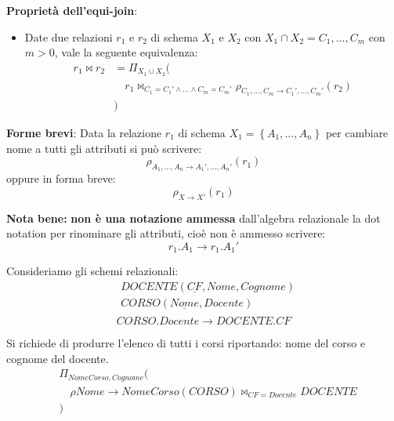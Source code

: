 \documentclass[a4paper,twoside]{article}
\begin{document}
\begin{itemize}
\begin{itemize}
\begin{itemize}
            \vspace{1em}
            \noindent
            \textbf{Proprietà dell'equi-join}:
            \begin{itemize}
              \item Date due relazioni \( r_1 \) e \( r_2 \) di schema \( X_1 \) e \( X_2 \) 
                con \( X_1 \cap X_2 = {C_1, \ldots, C_m} \) con \( m > 0 \), vale la
                seguente equivalenza:
                \[
                  \begin{aligned}
                    r_1 \bowtie r_2 &= \Pi_{X_1 \cup X_2}(\\
                                    & \quad r_1 \bowtie_{C_1 = C_1' \land \ldots \land C_m = C_m'}
                    \rho_{C_1, \ldots, C_m \to C_1', \ldots, C_m'}(r_2)\\
                                    &)
                  \end{aligned}
                \] 
            \end{itemize}

            \vspace{1em}
            \noindent
            \textbf{Forme brevi}: Data la relazione \( r_1 \) di schema \( X_1 = \left\{ A_1, \ldots, A_n \right\} \)
            per cambiare nome a tutti gli attributi si può scrivere:
            \[
               \rho_{A_1, \ldots, A_n \to A_1', \ldots, A_n'}(r_1)
            \] 
            oppure in forma breve:
            \[
              \rho_{X \to X'}(r_1)
            \] 

            \textbf{Nota bene:} \textbf{non è una notazione ammessa} dall'algebra relazionale la dot
            notation per rinominare gli attributi, cioè non è ammesso scrivere:
            \[
              r_1.A_1 \to r_1.A_1'
            \]

        \end{itemize}
        \begin{example}
          Consideriamo gli schemi relazionali:
          \[
            \begin{aligned}
              &DOCENTE(\underline{CF}, Nome, Cognome)\\
              &CORSO(\underline{Nome}, Docente)\\
            \end{aligned}
          \] 
          \[
            CORSO.Docente \to DOCENTE.CF
          \] 

          \vspace{1em}
          \noindent
          Si richiede di produrre l'elenco di tutti i corsi riportando: nome del corso
          e cognome del docente.
          \[
            \begin{aligned}
              &\Pi_{NomeCorso, Cognome}(\\
              &\quad \rho{Nome \to NomeCorso}(CORSO) \bowtie_{CF = Docente} DOCENTE\\
              &)
            \end{aligned}
          \]
        \end{example}
    \end{itemize}
\end{itemize}
\end{document}
